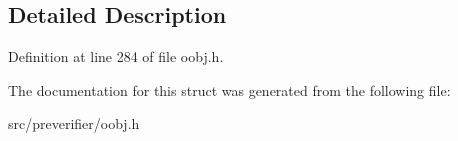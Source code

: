 \subsection{Detailed Description}


Definition at line 284 of file oobj.h.



The documentation for this struct was generated from the following file:\begin{DoxyCompactItemize}
\item 
src/preverifier/oobj.h\end{DoxyCompactItemize}
